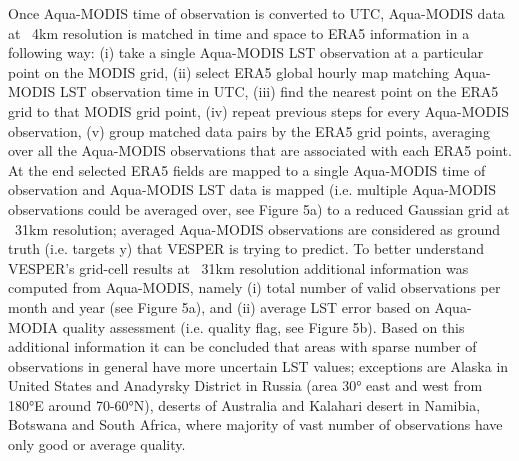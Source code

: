 \documentclass[hess, manuscript]{copernicus}
\begin{document}
Once Aqua-MODIS time of observation is converted to UTC, Aqua-MODIS data at ~4km resolution is matched in time and space to ERA5 information in a following way: (i) take a single Aqua-MODIS LST observation at a particular point on the MODIS grid, (ii) select ERA5 global hourly map matching Aqua-MODIS LST observation time in UTC, (iii) find the nearest point on the ERA5 grid to that MODIS grid point, (iv) repeat previous steps for every Aqua-MODIS observation, (v) group matched data pairs by the ERA5 grid points, averaging over all the Aqua-MODIS observations that are associated with each ERA5 point. At the end selected ERA5 fields are mapped to a single Aqua-MODIS time of observation and Aqua-MODIS LST data is mapped (i.e. multiple Aqua-MODIS observations could be averaged over, see Figure 5a) to a reduced Gaussian grid at ~31km resolution; averaged Aqua-MODIS observations are considered as ground truth (i.e. targets y) that VESPER is trying to predict. To better understand VESPER’s grid-cell results at ~31km resolution additional information was computed from Aqua-MODIS, namely (i) total number of valid observations per month and year (see Figure 5a), and (ii) average LST error based on Aqua-MODIA quality assessment (i.e. quality flag, see Figure 5b). Based on this additional information it can be concluded that areas with sparse number of observations in general have more uncertain LST values; exceptions are Alaska in United States and Anadyrsky District in Russia (area 30° east and west from 180°E around 70-60°N), deserts of Australia and Kalahari desert in Namibia, Botswana and South Africa, where majority of vast number of observations have only good or average quality.
\end{document}
